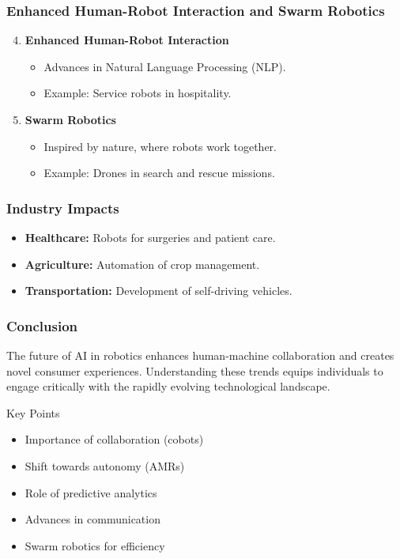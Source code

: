 \documentclass[aspectratio=169]{beamer}
\begin{document}
\begin{frame}[fragile]
    \frametitle{Enhanced Human-Robot Interaction and Swarm Robotics}
    \begin{enumerate}
        \setcounter{enumi}{3}
        \item \textbf{Enhanced Human-Robot Interaction}
            \begin{itemize}
                \item Advances in Natural Language Processing (NLP).
                \item Example: Service robots in hospitality.
            \end{itemize}

        \item \textbf{Swarm Robotics}
            \begin{itemize}
                \item Inspired by nature, where robots work together.
                \item Example: Drones in search and rescue missions.
            \end{itemize}
    \end{enumerate}
\end{frame}

\begin{frame}[fragile]
    \frametitle{Industry Impacts}
    \begin{itemize}
        \item \textbf{Healthcare:} Robots for surgeries and patient care.
        \item \textbf{Agriculture:} Automation of crop management.
        \item \textbf{Transportation:} Development of self-driving vehicles.
    \end{itemize}
\end{frame}

\begin{frame}[fragile]
    \frametitle{Conclusion}
    The future of AI in robotics enhances human-machine collaboration and creates novel consumer experiences. Understanding these trends equips individuals to engage critically with the rapidly evolving technological landscape.

    \begin{block}{Key Points}
        \begin{itemize}
            \item Importance of collaboration (cobots)
            \item Shift towards autonomy (AMRs)
            \item Role of predictive analytics
            \item Advances in communication
            \item Swarm robotics for efficiency
        \end{itemize}
    \end{block}
\end{frame}
\end{document}

